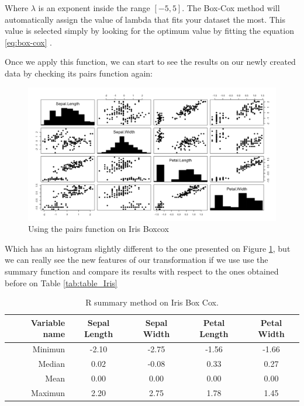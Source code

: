 \documentclass[12pt]{report}
\begin{document}
Where $\lambda$ is an exponent inside the range $[-5,5]$. The Box-Cox method will automatically assign the value of lambda that fits your dataset the most. This value is selected simply by looking for the optimum value by fitting the equation \ref{eq:box-cox} . \par

Once we apply this function, we can start to see the results on our newly created data by checking its pairs function again:

\begin{figure}[H]
	\centering
	\includegraphics[width=17cm]{Figuras_tfg/Figure_Boxcox}
	\caption{Using the pairs function on Iris Boxcox}
	\label{fig:figure_pairs_iris}
\end{figure}

Which has an histogram slightly different to the one presented on Figure \ref{fig:figure_pairs_iris}, but we can really see the new features of our transformation if we use use the summary function and compare its results with respect to the ones obtained before on Table \ref{tab:table_Iris}
\newline

\begin{table}[H]
		\caption{R summary method on Iris Box Cox.}
	\begin{center}
	\label{tab:table_Iris_Boxcox}
		\begin{tabular}{r|c|c|c|c} %
			\textbf{Variable name} & \textbf{Sepal Length} & \textbf{Sepal Width} & \textbf{Petal Length} & \textbf{Petal Width}\\
			\hline
			Minimun & -2.10 & -2.75 & -1.56 & -1.66\\
			Median & 0.02 & -0.08 & 0.33 & 0.27\\
			Mean & 0.00 & 0.00 & 0.00 & 0.00\\
			Maximun & 2.20 & 2.75 & 1.78 & 1.45\\
		\end{tabular}
	\end{center}
\end{table}
\end{document}
